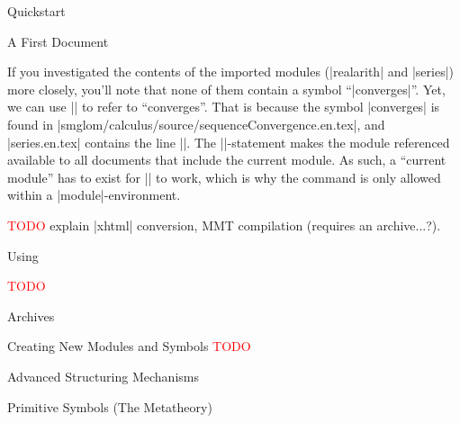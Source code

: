 \begin{omgroup}{Quickstart}
\begin{omgroup}{A First \sTeX Document}
    \begin{function}{\importmodule}
      If you investigated the contents of the imported modules 
      (|realarith| and |series|) more closely, you'll note that
      none of them contain a symbol ``|converges|''. Yet, we
      can use |\symref| to refer to ``converges''. That is because
      the symbol |converges| is found in 
      |smglom/calculus/source/sequenceConvergence.en.tex|, and
      |series.en.tex| contains the line
      ||. The |\importmodule|-statement
      makes the module referenced available to all documents
      that include the current module. As such, a ``current module''
      has to exist for |\importmodule| to work, which is why the command
      is only allowed within a |module|-environment.
    \end{function}

    \textcolor{red}{TODO} explain |xhtml| conversion, MMT compilation
    (requires an archive...?).

	\end{omgroup}
\end{omgroup}

\begin{omgroup}{Using \sTeX}
  
	\textcolor{red}{TODO}
  
  
\end{omgroup}

\begin{omgroup}[id=sec.stexarchives]{\sTeX Archives}
  
\end{omgroup}

\begin{omgroup}{Creating New Modules and Symbols}
	\textcolor{red}{TODO}

   
  
  
  
  \begin{omgroup}{Advanced Structuring Mechanisms}
    
  \end{omgroup}
  \begin{omgroup}{Primitive Symbols (The \sTeX Metatheory)}
    
  \end{omgroup}
\end{omgroup}

